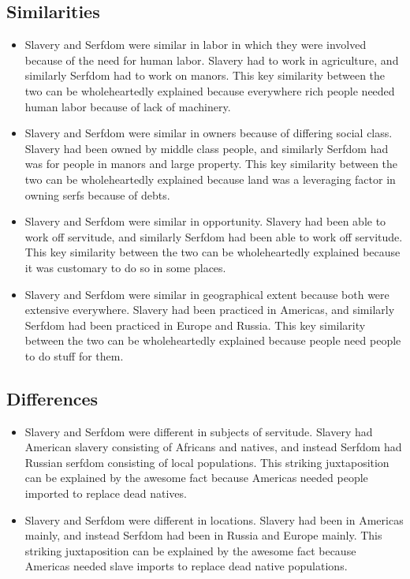 \documentclass[letterpaper, 10pt]{article}
\begin{document}
            \subsection{Similarities}
                \begin{itemize}
                    \item Slavery and Serfdom were similar in labor in which they were involved because of the need for human labor. Slavery had to work in agriculture, and similarly Serfdom had to work on manors. This key similarity between the two can be wholeheartedly explained because everywhere rich people needed human labor because of lack of machinery.
                    \item Slavery and Serfdom were similar in owners because of differing social class. Slavery had been owned by middle class people, and similarly Serfdom had was for people in manors and large property. This key similarity between the two can be wholeheartedly explained because land was a leveraging factor in owning serfs because of debts.
                    \item Slavery and Serfdom were similar in opportunity. Slavery had been able to work off servitude, and similarly Serfdom had been able to work off servitude. This key similarity between the two can be wholeheartedly explained because it was customary to do so in some places.
                    \item Slavery and Serfdom were similar in geographical extent because both were extensive everywhere. Slavery had been practiced in Americas, and similarly Serfdom had been practiced in Europe and Russia. This key similarity between the two can be wholeheartedly explained because people need people to do stuff for them.
                \end{itemize}
            \subsection{Differences}
                \begin{itemize}
                    \item Slavery and Serfdom were different in subjects of servitude. Slavery had American slavery consisting of Africans and natives, and instead Serfdom had Russian serfdom consisting of local populations. This striking juxtaposition can be explained by the awesome fact because Americas needed people imported to replace dead natives.
                    \item Slavery and Serfdom were different in locations. Slavery had been in Americas mainly, and instead Serfdom had been in Russia and Europe mainly. This striking juxtaposition can be explained by the awesome fact because Americas needed slave imports to replace dead native populations.
                \end{itemize}
\end{document}
